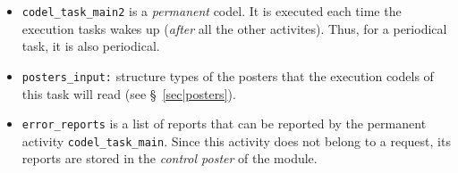 \begin{itemize}
\item {\tt codel\_task\_main2} is a {\em permanent} codel. It is executed each time
the execution tasks wakes  up ({\em after} all the other activites). Thus, for  a  periodical task, it is  also
periodical.

\item {\tt posters\_input:} structure types of the posters that the
execution codels of this task will read (see \S~\vref{sec|posters}).

\item {\tt error\_reports} is a list of reports that can be reported by the
permanent activity {\tt codel\_task\_main}. Since  this activity does not belong to
a request, its  reports are  stored in  the  {\em control poster} of  the
module.
\end{itemize}
